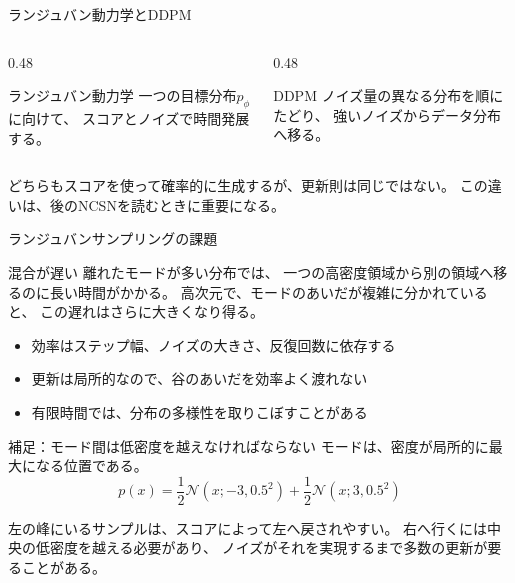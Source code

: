 \asmain
\begin{frame}{ランジュバン動力学とDDPM}
    \begin{columns}[T,onlytextwidth]
        \begin{column}{0.48\textwidth}
            \begin{block}{ランジュバン動力学}
                一つの目標分布$p_\phi$に向けて、
                スコアとノイズで時間発展する。
            \end{block}
        \end{column}
        \begin{column}{0.48\textwidth}
            \begin{block}{DDPM}
                ノイズ量の異なる分布を順にたどり、
                強いノイズからデータ分布へ移る。
            \end{block}
        \end{column}
    \end{columns}
    \vfill
    どちらもスコアを使って確率的に生成するが、更新則は同じではない。
    この違いは、後のNCSNを読むときに重要になる。
\end{frame}
\asmain
\begin{frame}{ランジュバンサンプリングの課題}
    \begin{block}{混合が遅い}
        離れたモードが多い分布では、
        一つの高密度領域から別の領域へ移るのに長い時間がかかる。
        高次元で、モードのあいだが複雑に分かれていると、
        この遅れはさらに大きくなり得る。
    \end{block}
    \begin{itemize}
        \item 効率はステップ幅、ノイズの大きさ、反復回数に依存する
        \item 更新は局所的なので、谷のあいだを効率よく渡れない
        \item 有限時間では、分布の多様性を取りこぼすことがある
    \end{itemize}
\end{frame}
\assuppl
\begin{frame}{補足：モード間は低密度を越えなければならない}
    モードは、密度が局所的に最大になる位置である。
    \[
        p(x)
        =
        \frac12\mathcal{N}(x;-3,0.5^2)
        +
        \frac12\mathcal{N}(x;3,0.5^2)
\]
    \centering
    \vfill
    左の峰にいるサンプルは、スコアによって左へ戻されやすい。
    右へ行くには中央の低密度を越える必要があり、
    ノイズがそれを実現するまで多数の更新が要ることがある。
\end{frame}

